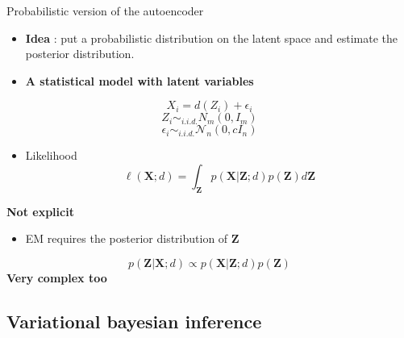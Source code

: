\documentclass[compress,10pt]{beamer}
\begin{document}

\begin{frame}{Probabilistic version of the autoencoder}
\protect\hypertarget{probabilistic-version-of-the-autoencoder}{}
\begin{itemize}
\item
  \textbf{Idea} : put a probabilistic distribution on the latent space and
  estimate the posterior distribution.
\item
  \textbf{A statistical model with latent variables}
\end{itemize}

\[X_i =d(Z_i) + \epsilon_i\] \[Z_i \sim_{i.i.d.}N_m(0,I_m)\]
\[\epsilon_i \sim_{i.i.d.} \mathcal{N}_n(0,c I_n)\]

\begin{itemize}
\item
  Likelihood
  \[\ell(\mathbf{X}; d)  =  \int_{\mathbf{Z}} p(\mathbf{X} | \mathbf{Z};d)p(\mathbf{Z})d\mathbf{Z}\]
\end{itemize}

\textbf{Not explicit}

\begin{itemize}
\item
  EM requires the posterior distribution of \(\mathbf{Z}\)
\end{itemize}

\[p(\mathbf{Z} | \mathbf{X}; d) \propto p(\mathbf{X}|\mathbf{Z}; d)p(\mathbf{Z}) \]
\textbf{Very complex too}
\end{frame}



\subsection{Variational bayesian inference}
\end{document}
